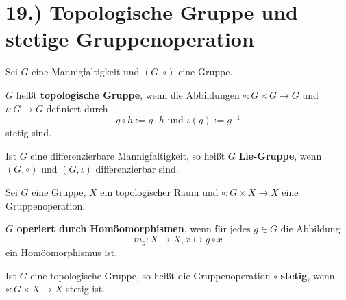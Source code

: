 \documentclass[a5paper,oneside]{scrbook}
\begin{document}
\section*{19.) Topologische Gruppe und stetige Gruppenoperation}
\begin{definition}%
    Sei $G$ eine Mannigfaltigkeit und $(G, \circ)$ eine Gruppe.

    \begin{defenum}
        \item $G$ heißt \textbf{topologische Gruppe},
              wenn die Abbildungen $\circ: G \times G \rightarrow G$
              und $\iota: G \rightarrow G$ definiert durch
              \[g \circ h := g \cdot h \text{ und } \iota(g) := g^{-1}\]
              stetig sind.
        \item Ist $G$ eine differenzierbare Mannigfaltigkeit, so heißt
              $G$ \textbf{Lie-Gruppe}, wenn
              $(G, \circ)$ und $(G, \iota)$ differenzierbar sind.
    \end{defenum}
\end{definition}

\begin{definition}
    Sei $G$ eine Gruppe, $X$ ein topologischer Raum und
    $\circ: G \times X \rightarrow X$ eine Gruppenoperation.

    \begin{defenum}
        \item {}\textbf{$G$ operiert durch Homöomorphismen}, wenn für jedes $g \in G$
              die Abbildung
              \[m_g: X \rightarrow X, x \mapsto g \circ x\]
              ein Homöomorphismus ist.
        \item Ist $G$ eine topologische Gruppe, so heißt die Gruppenoperation $\circ$
              \textbf{stetig}, wenn 
              $\circ: G \times X \rightarrow X$ stetig ist.
    \end{defenum}
\end{definition}

\end{document}
